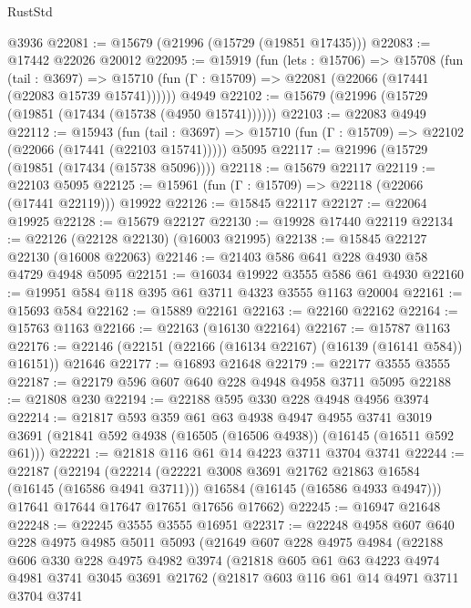 \begin{lexlean}{RustStd}
\begin{coremodule}
    @3936
@22081 := @15679 (@21996 (@15729 (@19851 @17435)))
@22083 := @17442 @22026 @20012
@22095 := @15919
    (fun (lets : @15706) =>
    @15708
      (fun (tail : @3697) =>
      @15710 (fun (Γ : @15709) => @22081 (@22066 (@17441 (@22083 @15739 @15741))))))
    @4949
@22102 := @15679 (@21996 (@15729 (@19851 (@17434 (@15738 (@4950 @15741))))))
@22103 := @22083 @4949
@22112 := @15943
    (fun (tail : @3697) => @15710 (fun (Γ : @15709) => @22102 (@22066 (@17441 (@22103 @15741)))))
    @5095
@22117 := @21996 (@15729 (@19851 (@17434 (@15738 @5096))))
@22118 := @15679 @22117
@22119 := @22103 @5095
@22125 := @15961 (fun (Γ : @15709) => @22118 (@22066 (@17441 @22119))) @19922
@22126 := @15845 @22117
@22127 := @22064 @19925
@22128 := @15679 @22127
@22130 := @19928 @17440 @22119
@22134 := @22126 (@22128 @22130) (@16003 @21995)
@22138 := @15845 @22127 @22130 (@16008 @22063)
@22146 := @21403 @586 @641 @228 @4930 @58 @4729 @4948 @5095
@22151 := @16034 @19922 @3555 @586 @61 @4930
@22160 := @19951 @584 @118 @395 @61 @3711 @4323 @3555 @1163 @20004
@22161 := @15693 @584
@22162 := @15889 @22161
@22163 := @22160 @22162
@22164 := @15763 @1163
@22166 := @22163 (@16130 @22164)
@22167 := @15787 @1163
@22176 := @22146 (@22151 (@22166 (@16134 @22167) (@16139 (@16141 @584)) @16151)) @21646
@22177 := @16893 @21648
@22179 := @22177 @3555 @3555
@22187 := @22179 @596 @607 @640 @228 @4948 @4958 @3711 @5095
@22188 := @21808 @230
@22194 := @22188 @595 @330 @228 @4948 @4956 @3974
@22214 := @21817
    @593
    @359
    @61
    @63
    @4938
    @4947
    @4955
    @3741
    @3019
    @3691
    (@21841 @592 @4938 (@16505 (@16506 @4938)) (@16145 (@16511 @592 @61)))
@22221 := @21818 @116 @61 @14 @4223 @3711 @3704 @3741
@22244 := @22187
    (@22194
      (@22214
        (@22221 @3008 @3691 @21762 @21863 @16584 (@16145 (@16586 @4941 @3711)))
        @16584
        (@16145 (@16586 @4933 @4947)))
      @17641
      @17644
      @17647
      @17651
      @17656
      @17662)
@22245 := @16947 @21648
@22248 := @22245 @3555 @3555 @16951
@22317 := @22248
    @4958
    @607
    @640
    @228
    @4975
    @4985
    @5011
    @5093
    (@21649
      @607
      @228
      @4975
      @4984
      (@22188
        @606
        @330
        @228
        @4975
        @4982
        @3974
        (@21818
          @605
          @61
          @63
          @4223
          @4974
          @4981
          @3741
          @3045
          @3691
          @21762
          (@21817
            @603
            @116
            @61
            @14
            @4971
            @3711
            @3704
            @3741

\end{coremodule}
\end{lexlean}
